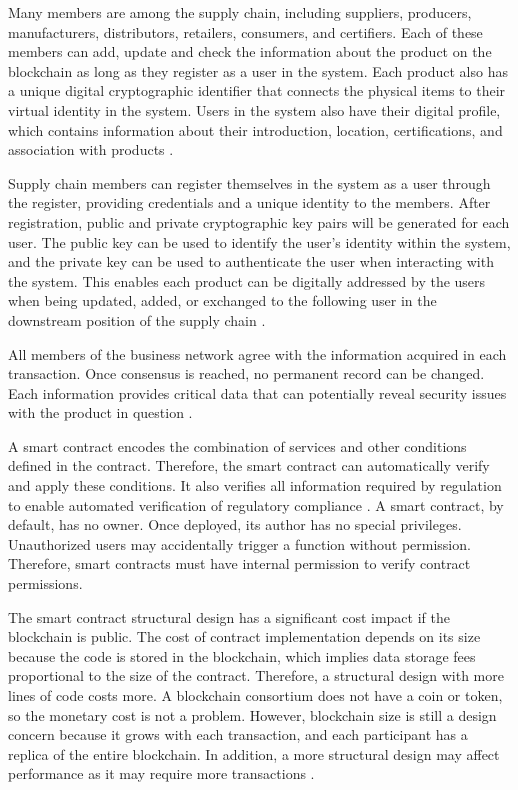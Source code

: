 Many members are among the supply chain, including suppliers, producers, manufacturers, distributors, retailers, consumers, and certifiers. Each of these members can add, update and check the information about the product on the blockchain as long as they register as a user in the system. Each product also has a unique digital cryptographic identifier that connects the physical items to their virtual identity in the system. Users in the system also have their digital profile, which contains information about their introduction, location, certifications, and association with products \cite{tian2017supply}.

Supply chain members can register themselves in the system as a user through the register, providing credentials and a unique identity to the members. After registration, public and private cryptographic key pairs will be generated for each user. The public key can be used to identify the user's identity within the system, and the private key can be used to authenticate the user when interacting with the system. This enables each product can be digitally addressed by the users when being updated, added, or exchanged to the following user in the downstream position of the supply chain \cite{caro2018blockchain}.

All members of the business network agree with the information acquired in each transaction. Once consensus is reached, no permanent record can be changed. Each information provides critical data that can potentially reveal security issues with the product in question \cite{galvez2018future}.

A smart contract encodes the combination of services and other conditions defined in the contract. Therefore, the smart contract can automatically verify and apply these conditions. It also verifies all information required by regulation to enable automated verification of regulatory compliance \cite{lu2017adaptable}.  A smart contract, by default, has no owner. Once deployed, its author has no special privileges. Unauthorized users may accidentally trigger a function without permission. Therefore, smart contracts must have internal permission to verify contract permissions.

The smart contract structural design has a significant cost impact if the blockchain is public. The cost of contract implementation depends on its size because the code is stored in the blockchain, which implies data storage fees proportional to the size of the contract. Therefore, a structural design with more lines of code costs more. A blockchain consortium does not have a coin or token, so the monetary cost is not a problem. However, blockchain size is still a design concern because it grows with each transaction, and each participant has a replica of the entire blockchain. In addition, a more structural design may affect performance as it may require more transactions \cite{lu2017adaptable}.

